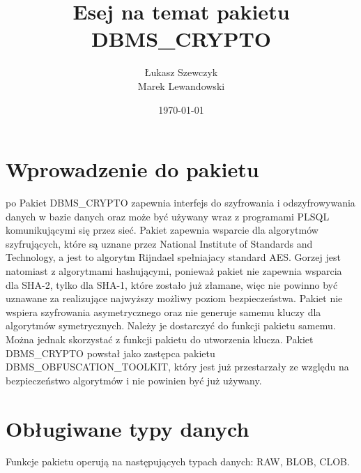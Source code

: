 \documentclass[12pt, a4paper]{article}
\begin{document}
\title{Esej na temat pakietu DBMS\_CRYPTO}
\author{Łukasz Szewczyk\\
Marek Lewandowski }
\date{\today}



\maketitle


\section{Wprowadzenie do pakietu}
po
Pakiet DBMS\_CRYPTO zapewnia interfejs do szyfrowania i odszyfrowywania
danych w bazie danych oraz może być używany wraz z programami PL\/SQL
komunikującymi się przez sieć. Pakiet zapewnia wsparcie dla algorytmów
szyfrujących, które są uznane przez National Institute of Standards and
Technology, a jest to algorytm Rijndael spełniajacy standard AES. Gorzej
jest natomiast z algorytmami hashującymi, ponieważ pakiet nie zapewnia
wsparcia dla SHA-2, tylko dla SHA-1, które zostało już złamane, więc
nie powinno być uznawane za realizujące najwyższy możliwy poziom
bezpieczeństwa. Pakiet nie wspiera szyfrowania asymetrycznego oraz nie
generuje samemu kluczy dla algorytmów symetrycznych. Należy je
dostarczyć do funkcji pakietu samemu. Można jednak skorzystać z funkcji
pakietu do utworzenia klucza. Pakiet DBMS\_CRYPTO powstał jako zastępca
pakietu DBMS\_OBFUSCATION\_TOOLKIT, który jest już przestarzały ze
względu na bezpieczeństwo algorytmów i nie powinien być już używany.


\section{Obługiwane typy danych}
Funkcje pakietu operują na następujących typach danych: RAW, BLOB, CLOB.
\end{document}
